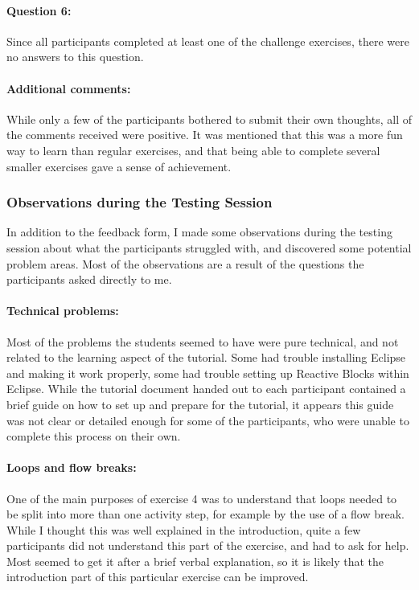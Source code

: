 \paragraph{Question 6:} Since all participants completed at least one of the challenge exercises, there were no answers to this question.

\paragraph{Additional comments:} While only a few of the participants bothered to submit their own thoughts, all of the comments received were positive. It was mentioned that this was a more fun way to learn than regular exercises, and that being able to complete several smaller exercises gave a sense of achievement.

\subsubsection{Observations during the Testing Session}
In addition to the feedback form, I made some observations during the testing session about what the participants struggled with, and discovered some potential problem areas. Most of the observations are a result of the questions the participants asked directly to me.

\paragraph{Technical problems:} Most of the problems the students seemed to have were pure technical, and not related to the learning aspect of the tutorial. Some had trouble installing Eclipse and making it work properly, some had trouble setting up Reactive Blocks within Eclipse. While the tutorial document handed out to each participant contained a brief guide on how to set up and prepare for the tutorial, it appears this guide was not clear or detailed enough for some of the participants, who were unable to complete this process on their own.

\paragraph{Loops and flow breaks:} One of the main purposes of exercise 4 was to understand that loops needed to be split into more than one activity step, for example by the use of a flow break. While I thought this was well explained in the introduction, quite a few participants did not understand this part of the exercise, and had to ask for help. Most seemed to get it after a brief verbal explanation, so it is likely that the introduction part of this particular exercise can be improved.

